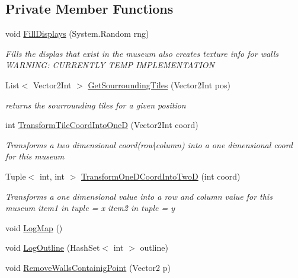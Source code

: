 \subsection*{Private Member Functions}
\begin{DoxyCompactItemize}
\item 
void \mbox{\hyperlink{class_museum_ae07741bc8fd7f97c84fed0050e18c3c4}{Fill\+Displays}} (System.\+Random rng)
\begin{DoxyCompactList}\small\item\em Fills the displas that exist in the museum also creates texture info for walls W\+A\+R\+N\+I\+NG\+: C\+U\+R\+R\+E\+N\+T\+LY T\+E\+MP I\+M\+P\+L\+E\+M\+E\+N\+T\+A\+T\+I\+ON \end{DoxyCompactList}\item 
List$<$ Vector2\+Int $>$ \mbox{\hyperlink{class_museum_af5b732fe3a0821d02852171a73cf8f8b}{Get\+Sourrounding\+Tiles}} (Vector2\+Int pos)
\begin{DoxyCompactList}\small\item\em returns the sourrounding tiles for a given position \end{DoxyCompactList}\item 
int \mbox{\hyperlink{class_museum_a405e60db962417dde46d46180cbf81df}{Transform\+Tile\+Coord\+Into\+OneD}} (Vector2\+Int coord)
\begin{DoxyCompactList}\small\item\em Transforms a two dimensional coord(row$\vert$column) into a one dimensional coord for this museum \end{DoxyCompactList}\item 
Tuple$<$ int, int $>$ \mbox{\hyperlink{class_museum_a72e9020ee5d8406df0fc41fc4295727f}{Transform\+One\+D\+Coord\+Into\+TwoD}} (int coord)
\begin{DoxyCompactList}\small\item\em Transforms a one dimensional value into a row and column value for this museum item1 in tuple = x item2 in tuple = y \end{DoxyCompactList}\item 
void \mbox{\hyperlink{class_museum_a6a161feedcbb8a471eb0e68b7e3e4027}{Log\+Map}} ()
\item 
void \mbox{\hyperlink{class_museum_a237d1ccf7cb53c4db64647b6addc6576}{Log\+Outline}} (Hash\+Set$<$ int $>$ outline)
\item 
void \mbox{\hyperlink{class_museum_a6b395af086d9773720b1cb5536f405a8}{Remove\+Walls\+Containig\+Point}} (Vector2 p)
\end{DoxyCompactItemize}
